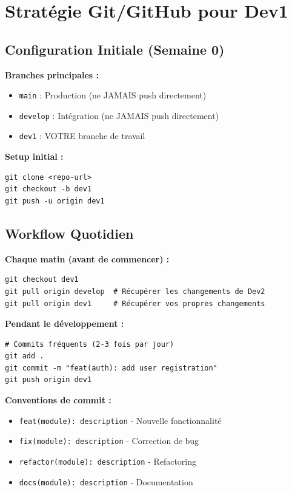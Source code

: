 \documentclass[11pt,a4paper]{article}
\begin{document}
\section{Stratégie Git/GitHub pour Dev1}

\subsection{Configuration Initiale (Semaine 0)}

\textbf{Branches principales :}
\begin{itemize}
    \item \texttt{main} : Production (ne JAMAIS push directement)
    \item \texttt{develop} : Intégration (ne JAMAIS push directement)
    \item \texttt{dev1} : VOTRE branche de travail
\end{itemize}

\textbf{Setup initial :}
\begin{verbatim}
git clone <repo-url>
git checkout -b dev1
git push -u origin dev1
\end{verbatim}

\subsection{Workflow Quotidien}

\textbf{Chaque matin (avant de commencer) :}
\begin{verbatim}
git checkout dev1
git pull origin develop  # Récupérer les changements de Dev2
git pull origin dev1     # Récupérer vos propres changements
\end{verbatim}

\textbf{Pendant le développement :}
\begin{verbatim}
# Commits fréquents (2-3 fois par jour)
git add .
git commit -m "feat(auth): add user registration"
git push origin dev1
\end{verbatim}

\textbf{Conventions de commit :}
\begin{itemize}
    \item \texttt{feat(module): description} - Nouvelle fonctionnalité
    \item \texttt{fix(module): description} - Correction de bug
    \item \texttt{refactor(module): description} - Refactoring
    \item \texttt{docs(module): description} - Documentation
\end{itemize}
\end{document}
